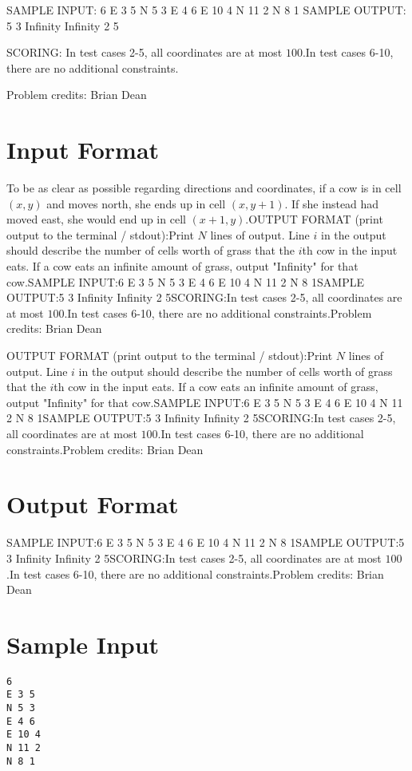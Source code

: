 \documentclass[12pt]{article}
\begin{document}
SAMPLE INPUT:
6
E 3 5
N 5 3
E 4 6
E 10 4
N 11 2
N 8 1
SAMPLE OUTPUT: 
5
3
Infinity
Infinity
2
5

SCORING:
In test cases 2-5, all coordinates are at most $100$.In test cases 6-10, there are no additional constraints.


Problem credits: Brian Dean



\section*{Input Format}
To be as clear as possible regarding directions and coordinates, if a cow is in cell $(x,y)$ and moves north,
she ends up in cell $(x,y+1)$.  If she instead had moved east, she would end up
in cell $(x+1, y)$.OUTPUT FORMAT (print output to the terminal / stdout):Print $N$ lines of output.  Line $i$ in the output should describe the number of
cells worth of grass that the $i$th cow in the input eats.  If a cow eats an
infinite amount of grass, output "Infinity" for that cow.SAMPLE INPUT:6
E 3 5
N 5 3
E 4 6
E 10 4
N 11 2
N 8 1SAMPLE OUTPUT:5
3
Infinity
Infinity
2
5SCORING:In test cases 2-5, all coordinates are at most $100$.In test cases 6-10, there are no additional constraints.Problem credits: Brian Dean

OUTPUT FORMAT (print output to the terminal / stdout):Print $N$ lines of output.  Line $i$ in the output should describe the number of
cells worth of grass that the $i$th cow in the input eats.  If a cow eats an
infinite amount of grass, output "Infinity" for that cow.SAMPLE INPUT:6
E 3 5
N 5 3
E 4 6
E 10 4
N 11 2
N 8 1SAMPLE OUTPUT:5
3
Infinity
Infinity
2
5SCORING:In test cases 2-5, all coordinates are at most $100$.In test cases 6-10, there are no additional constraints.Problem credits: Brian Dean

\section*{Output Format}
SAMPLE INPUT:6
E 3 5
N 5 3
E 4 6
E 10 4
N 11 2
N 8 1SAMPLE OUTPUT:5
3
Infinity
Infinity
2
5SCORING:In test cases 2-5, all coordinates are at most $100$.In test cases 6-10, there are no additional constraints.Problem credits: Brian Dean

\section*{Sample Input}
\begin{verbatim}
6
E 3 5
N 5 3
E 4 6
E 10 4
N 11 2
N 8 1
\end{verbatim}
\end{document}
